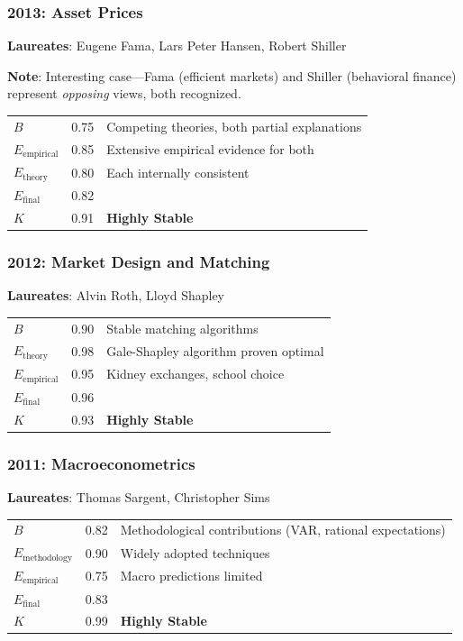 \documentclass[11pt,a4paper]{article}
\begin{document}
\subsubsection{2013: Asset Prices}
\textbf{Laureates}: Eugene Fama, Lars Peter Hansen, Robert Shiller

\textbf{Note}: Interesting case---Fama (efficient markets) and Shiller (behavioral finance) represent \textit{opposing} views, both recognized.

\begin{center}
\begin{tabular}{lcl}
\toprule
$B$ & 0.75 & Competing theories, both partial explanations \\
$E_{\text{empirical}}$ & 0.85 & Extensive empirical evidence for both \\
$E_{\text{theory}}$ & 0.80 & Each internally consistent \\
\midrule
$E_{\text{final}}$ & 0.82 & \\
$K$ & 0.91 & \textbf{Highly Stable} \\
\bottomrule
\end{tabular}
\end{center}

\subsubsection{2012: Market Design and Matching}
\textbf{Laureates}: Alvin Roth, Lloyd Shapley

\begin{center}
\begin{tabular}{lcl}
\toprule
$B$ & 0.90 & Stable matching algorithms \\
$E_{\text{theory}}$ & 0.98 & Gale-Shapley algorithm proven optimal \\
$E_{\text{empirical}}$ & 0.95 & Kidney exchanges, school choice \\
\midrule
$E_{\text{final}}$ & 0.96 & \\
$K$ & 0.93 & \textbf{Highly Stable} \\
\bottomrule
\end{tabular}
\end{center}

\subsubsection{2011: Macroeconometrics}
\textbf{Laureates}: Thomas Sargent, Christopher Sims

\begin{center}
\begin{tabular}{lcl}
\toprule
$B$ & 0.82 & Methodological contributions (VAR, rational expectations) \\
$E_{\text{methodology}}$ & 0.90 & Widely adopted techniques \\
$E_{\text{empirical}}$ & 0.75 & Macro predictions limited \\
\midrule
$E_{\text{final}}$ & 0.83 & \\
$K$ & 0.99 & \textbf{Highly Stable} \\
\bottomrule
\end{tabular}
\end{center}
\end{document}

